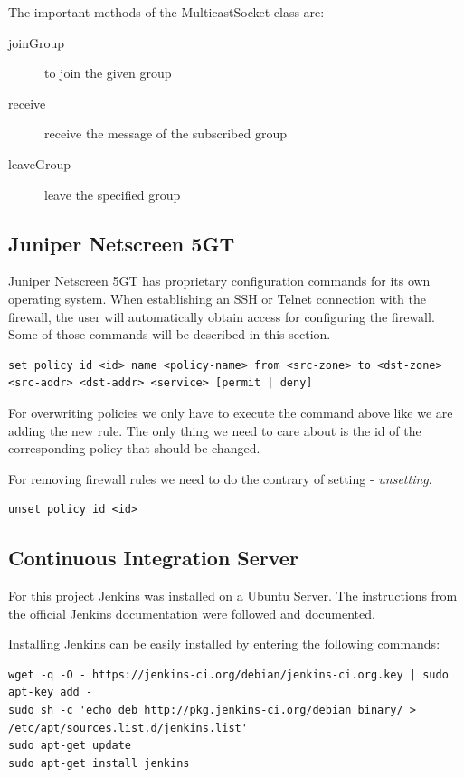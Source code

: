 \documentclass[11pt, a4paper]{article}
\begin{document}
The important methods of the MulticastSocket class are:
\begin{description}
\item[joinGroup] to join the given group
\item[receive] receive the message of the subscribed group
\item[leaveGroup] leave the specified group
\end{description}

\subsection{Juniper Netscreen 5GT}

Juniper Netscreen 5GT has proprietary configuration commands for its own operating system. When establishing an SSH or Telnet connection with the firewall, the user will automatically obtain access for configuring the firewall. Some of those commands will be described in this section. 

\begin{lstlisting}
set policy id <id> name <policy-name> from <src-zone> to <dst-zone> <src-addr> <dst-addr> <service> [permit | deny]
\end{lstlisting}

For overwriting policies we only have to execute the command above like we are adding the new rule. The only thing we need to care about is the id of the corresponding policy that should be changed. 

For removing firewall rules we need to do the contrary of setting - \textit{unsetting}.

\begin{lstlisting}
unset policy id <id> 
\end{lstlisting}


\subsection{Continuous Integration Server}

For this project Jenkins was installed on a Ubuntu Server. The instructions from the official Jenkins documentation \cite{jenkins:ubuntu} were followed and documented. 

Installing Jenkins can be easily installed by entering the following commands: 

\begin{lstlisting}
wget -q -O - https://jenkins-ci.org/debian/jenkins-ci.org.key | sudo apt-key add -
sudo sh -c 'echo deb http://pkg.jenkins-ci.org/debian binary/ > /etc/apt/sources.list.d/jenkins.list'
sudo apt-get update
sudo apt-get install jenkins 
\end{lstlisting}
\end{document}
